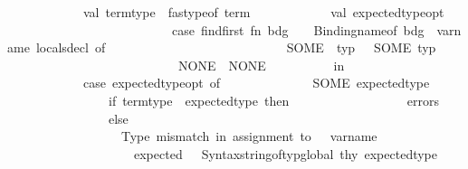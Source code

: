 \begin{isabellebody}
\ \ \ \ \ \ \ \ \ \ \ \ val\ term{\isacharunderscore}{\kern0pt}type\ {\isacharequal}{\kern0pt}\ fastype{\isacharunderscore}{\kern0pt}of\ term\isanewline
\ \ \ \ \ \ \ \ \ \ \ \ val\ expected{\isacharunderscore}{\kern0pt}type{\isacharunderscore}{\kern0pt}opt\ {\isacharequal}{\kern0pt}\ \isanewline
\ \ \ \ \ \ \ \ \ \ \ \ \ \ \ \ \ \ \ \ \ \ \ \ \ \ case\ find{\isacharunderscore}{\kern0pt}first\ {\isacharparenleft}{\kern0pt}fn\ {\isacharparenleft}{\kern0pt}{\isacharparenleft}{\kern0pt}bdg{\isacharprime}{\kern0pt}{\isacharcomma}{\kern0pt}\ {\isacharunderscore}{\kern0pt}{\isacharparenright}{\kern0pt}{\isacharcomma}{\kern0pt}\ {\isacharunderscore}{\kern0pt}{\isacharparenright}{\kern0pt}\ {\isacharequal}{\kern0pt}{\isachargreater}{\kern0pt}\ Binding{\isachardot}{\kern0pt}name{\isacharunderscore}{\kern0pt}of\ bdg{\isacharprime}{\kern0pt}\ {\isacharequal}{\kern0pt}\ var{\isacharunderscore}{\kern0pt}name{\isacharparenright}{\kern0pt}\ locals{\isacharunderscore}{\kern0pt}decl\ of\isanewline
\ \ \ \ \ \ \ \ \ \ \ \ \ \ \ \ \ \ \ \ \ \ \ \ \ \ \ \ SOME\ {\isacharparenleft}{\kern0pt}{\isacharparenleft}{\kern0pt}{\isacharunderscore}{\kern0pt}{\isacharcomma}{\kern0pt}\ typ{\isacharparenright}{\kern0pt}{\isacharcomma}{\kern0pt}\ {\isacharunderscore}{\kern0pt}{\isacharparenright}{\kern0pt}\ {\isacharequal}{\kern0pt}{\isachargreater}{\kern0pt}\ SOME\ typ\isanewline
\ \ \ \ \ \ \ \ \ \ \ \ \ \ \ \ \ \ \ \ \ \ \ \ \ \ {\isacharbar}{\kern0pt}\ NONE\ {\isacharequal}{\kern0pt}{\isachargreater}{\kern0pt}\ NONE\isanewline
\ \ \ \ \ \ \ \ \ \ in\isanewline
\ \ \ \ \ \ \ \ \ \ \ \ case\ expected{\isacharunderscore}{\kern0pt}type{\isacharunderscore}{\kern0pt}opt\ of\isanewline
\ \ \ \ \ \ \ \ \ \ \ \ \ \ SOME\ expected{\isacharunderscore}{\kern0pt}type\ {\isacharequal}{\kern0pt}{\isachargreater}{\kern0pt}\isanewline
\ \ \ \ \ \ \ \ \ \ \ \ \ \ \ \ if\ term{\isacharunderscore}{\kern0pt}type\ {\isacharequal}{\kern0pt}\ expected{\isacharunderscore}{\kern0pt}type\ then\isanewline
\ \ \ \ \ \ \ \ \ \ \ \ \ \ \ \ \ \ errors\isanewline
\ \ \ \ \ \ \ \ \ \ \ \ \ \ \ \ else\isanewline
\ \ \ \ \ \ \ \ \ \ \ \ \ \ \ \ \ \ {\isacharparenleft}{\kern0pt}{\isachardoublequote}{\kern0pt}Type\ mismatch\ in\ assignment\ to\ {\isachardoublequote}{\kern0pt}\ {\isacharcircum}{\kern0pt}\ var{\isacharunderscore}{\kern0pt}name\ {\isacharcircum}{\kern0pt}\isanewline
\ \ \ \ \ \ \ \ \ \ \ \ \ \ \ \ \ \ \ {\isachardoublequote}{\kern0pt}{\isacharcolon}{\kern0pt}\ expected\ {\isachardoublequote}{\kern0pt}\ {\isacharcircum}{\kern0pt}\ Syntax{\isachardot}{\kern0pt}string{\isacharunderscore}{\kern0pt}of{\isacharunderscore}{\kern0pt}typ{\isacharunderscore}{\kern0pt}global\ thy\ expected{\isacharunderscore}{\kern0pt}type\ {\isacharcircum}{\kern0pt}\isanewline

\end{isabellebody}
